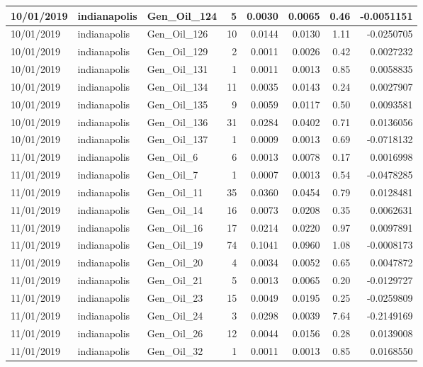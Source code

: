 \documentclass[
  letterpaper,
  DIV=11,
  numbers=noendperiod]{scrartcl}
\begin{document}
\begin{tabular}{l|l|l|r|r|r|r|r}
\hline
10/01/2019 & indianapolis & Gen\_Oil\_124 & 5 & 0.0030 & 0.0065 & 0.46 & -0.0051151\\
\hline
10/01/2019 & indianapolis & Gen\_Oil\_126 & 10 & 0.0144 & 0.0130 & 1.11 & -0.0250705\\
\hline
10/01/2019 & indianapolis & Gen\_Oil\_129 & 2 & 0.0011 & 0.0026 & 0.42 & 0.0027232\\
\hline
10/01/2019 & indianapolis & Gen\_Oil\_131 & 1 & 0.0011 & 0.0013 & 0.85 & 0.0058835\\
\hline
10/01/2019 & indianapolis & Gen\_Oil\_134 & 11 & 0.0035 & 0.0143 & 0.24 & 0.0027907\\
\hline
10/01/2019 & indianapolis & Gen\_Oil\_135 & 9 & 0.0059 & 0.0117 & 0.50 & 0.0093581\\
\hline
10/01/2019 & indianapolis & Gen\_Oil\_136 & 31 & 0.0284 & 0.0402 & 0.71 & 0.0136056\\
\hline
10/01/2019 & indianapolis & Gen\_Oil\_137 & 1 & 0.0009 & 0.0013 & 0.69 & -0.0718132\\
\hline
11/01/2019 & indianapolis & Gen\_Oil\_6 & 6 & 0.0013 & 0.0078 & 0.17 & 0.0016998\\
\hline
11/01/2019 & indianapolis & Gen\_Oil\_7 & 1 & 0.0007 & 0.0013 & 0.54 & -0.0478285\\
\hline
11/01/2019 & indianapolis & Gen\_Oil\_11 & 35 & 0.0360 & 0.0454 & 0.79 & 0.0128481\\
\hline
11/01/2019 & indianapolis & Gen\_Oil\_14 & 16 & 0.0073 & 0.0208 & 0.35 & 0.0062631\\
\hline
11/01/2019 & indianapolis & Gen\_Oil\_16 & 17 & 0.0214 & 0.0220 & 0.97 & 0.0097891\\
\hline
11/01/2019 & indianapolis & Gen\_Oil\_19 & 74 & 0.1041 & 0.0960 & 1.08 & -0.0008173\\
\hline
11/01/2019 & indianapolis & Gen\_Oil\_20 & 4 & 0.0034 & 0.0052 & 0.65 & 0.0047872\\
\hline
11/01/2019 & indianapolis & Gen\_Oil\_21 & 5 & 0.0013 & 0.0065 & 0.20 & -0.0129727\\
\hline
11/01/2019 & indianapolis & Gen\_Oil\_23 & 15 & 0.0049 & 0.0195 & 0.25 & -0.0259809\\
\hline
11/01/2019 & indianapolis & Gen\_Oil\_24 & 3 & 0.0298 & 0.0039 & 7.64 & -0.2149169\\
\hline
11/01/2019 & indianapolis & Gen\_Oil\_26 & 12 & 0.0044 & 0.0156 & 0.28 & 0.0139008\\
\hline
11/01/2019 & indianapolis & Gen\_Oil\_32 & 1 & 0.0011 & 0.0013 & 0.85 & 0.0168550\\

\end{tabular}
\end{document}
